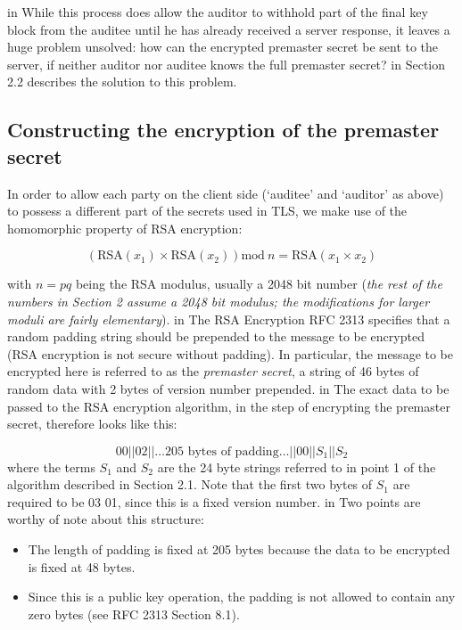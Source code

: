 \documentclass[10pt,a4paper]{article}
\begin{document}
 in 
\noindent While this process does allow the auditor to withhold part of the final key block from the auditee until he has already received a server response, it leaves a huge problem unsolved: how can the encrypted premaster secret be sent to the server, if neither auditor nor auditee knows the full premaster secret?
 in 
\noindent Section 2.2 describes the solution to this problem.


\subsection{Constructing the encryption of the premaster secret}
\noindent In order to allow each party on the client side (`auditee' and `auditor' as above) to possess a different part of the secrets used in TLS, we make use of the homomorphic property of RSA encryption:
\begin{center}
\[\left(\textrm{RSA}(x_1) \times \textrm{RSA}(x_2)\right) \textrm{mod}\ n = \textrm{RSA}(x_1 \times x_2)\]
\end{center}
\noindent with $n=pq$ being the RSA modulus, usually a 2048 bit number (\textit{the rest of the numbers in Section 2 assume a 2048 bit modulus; the modifications for larger moduli are fairly elementary}).
 in 
\noindent The RSA Encryption RFC 2313 \cite{RSA_spec} specifies that a random padding string should be prepended to the message to be encrypted (RSA encryption is not secure without padding). In particular, the message to be encrypted here is referred to as the \textit{premaster secret}, a string of 46 bytes of random data with 2 bytes of version number prepended.
 in 
\noindent The exact data to be passed to the RSA encryption algorithm, in the step of encrypting the premaster secret, therefore looks like this:

\begin{equation}\label{blockformat}
 00 || 02 || \ldots \textrm{205 bytes of padding} \ldots || 00 || S_1 || S_2  
\end{equation}
where the terms $S_1$ and $S_2$ are the 24 byte strings referred to in point 1 of the algorithm described in Section 2.1. Note that the first two bytes of $S_1$ are required to be 03 01, since this is a fixed version number.
 in 
\noindent Two points are worthy of note about this structure:
\begin{itemize}
\item The length of padding is fixed at 205 bytes because the data to be encrypted is fixed at 48 bytes.
\item Since this is a public key operation, the padding is not allowed to contain any zero bytes (see RFC 2313 Section 8.1).
\end{itemize}
\end{document}
